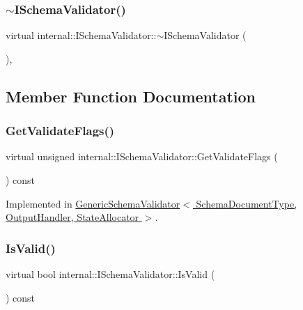 \subsubsection{\texorpdfstring{$\sim$\+I\+Schema\+Validator()}{~ISchemaValidator()}}
{\footnotesize\ttfamily virtual internal\+::\+I\+Schema\+Validator\+::$\sim$\+I\+Schema\+Validator (\begin{DoxyParamCaption}{ }\end{DoxyParamCaption})\hspace{0.3cm}{\ttfamily [inline]}, {\ttfamily [virtual]}}



\subsection{Member Function Documentation}
\mbox{\label{classinternal_1_1ISchemaValidator_aa27d587f8e6fa2b95235a6ffa077429d}} 
\subsubsection{\texorpdfstring{Get\+Validate\+Flags()}{GetValidateFlags()}}
{\footnotesize\ttfamily virtual unsigned internal\+::\+I\+Schema\+Validator\+::\+Get\+Validate\+Flags (\begin{DoxyParamCaption}{ }\end{DoxyParamCaption}) const\hspace{0.3cm}{\ttfamily [pure virtual]}}



Implemented in \hyperlink{classGenericSchemaValidator_a318bf1cf98d2f18074edd336b1bc684d}{Generic\+Schema\+Validator$<$ Schema\+Document\+Type, Output\+Handler, State\+Allocator $>$}.

\mbox{\label{classinternal_1_1ISchemaValidator_a94f61f24b1447497279ef12ee0127285}} 
\subsubsection{\texorpdfstring{Is\+Valid()}{IsValid()}}
{\footnotesize\ttfamily virtual bool internal\+::\+I\+Schema\+Validator\+::\+Is\+Valid (\begin{DoxyParamCaption}{ }\end{DoxyParamCaption}) const\hspace{0.3cm}{\ttfamily [pure virtual]}}




